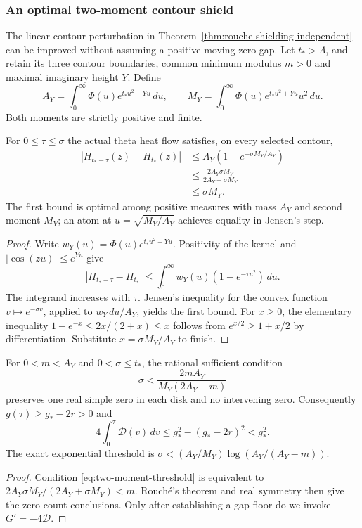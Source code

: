 \subsubsection{An optimal two-moment contour shield}
\label{subsec:two-moment-shield}
The linear contour perturbation in
Theorem~\ref{thm:rouche-shielding-independent}
can be improved without assuming a positive
moving zero gap. Let $t_*>\Lambda$, and
retain its three contour boundaries, common
minimum modulus $m>0$ and maximal imaginary
height $Y$. Define
\[
A_Y=\int_0^\infty\Phi(u)e^{t_*u^2+Yu}\,du,\qquad
M_Y=\int_0^\infty\Phi(u)e^{t_*u^2+Yu}u^2\,du.
\]
Both moments are strictly positive and finite.

\begin{theorem}
\label{thm:two-moment-shield}
For $0\le\tau\le\sigma$ the actual theta
heat flow satisfies, on every selected contour,
\begin{equation}\label{eq:two-moment-shield}
\begin{aligned}
|H_{t_*-\tau}(z)-H_{t_*}(z)|
&\le A_Y(1-e^{-\sigma M_Y/A_Y})\\
&\le\frac{2A_Y\sigma M_Y}{2A_Y+\sigma M_Y}\\
&\le\sigma M_Y.
\end{aligned}
\end{equation}
The first bound is optimal among positive
measures with mass $A_Y$ and second moment
$M_Y$; an atom at $u=\sqrt{M_Y/A_Y}$
achieves equality in Jensen's step.
\end{theorem}
\begin{proof}
Write $w_Y(u)=\Phi(u)e^{t_*u^2+Yu}$.
Positivity of the kernel and
$|\cos(zu)|\le e^{Yu}$ give
\[
|H_{t_*-\tau}-H_{t_*}|
\le\int_0^\infty w_Y(u)(1-e^{-\tau u^2})\,du.
\]
The integrand increases with $\tau$.
Jensen's inequality for the convex function
$v\mapsto e^{-\sigma v}$, applied to
$w_Y\,du/A_Y$, yields the first bound.
For $x\ge0$, the elementary inequality
$1-e^{-x}\le2x/(2+x)\le x$
follows from $e^{x/2}\ge1+x/2$
by differentiation. Substitute
$x=\sigma M_Y/A_Y$ to finish.
\end{proof}

\begin{corollary}
\label{cor:two-moment-window}
For $0<m<A_Y$ and $0<\sigma\le t_*$,
the rational sufficient condition
\begin{equation}\label{eq:two-moment-threshold}
\sigma<\frac{2mA_Y}{M_Y(2A_Y-m)}
\end{equation}
preserves one real simple zero in each
disk and no intervening zero. Consequently
$g(\tau)\ge g_*-2r>0$ and
\[
4\int_0^\tau\mathcal D(v)\,dv
\le g_*^2-(g_*-2r)^2<g_*^2.
\]
The exact exponential threshold is
$\sigma<(A_Y/M_Y)\log(A_Y/(A_Y-m))$.
\end{corollary}
\begin{proof}
Condition \eqref{eq:two-moment-threshold}
is equivalent to
$2A_Y\sigma M_Y/(2A_Y+\sigma M_Y)<m$.
Rouch\'e's theorem and real symmetry
then give the zero-count conclusions.
Only after establishing a gap floor do
we invoke $G'=-4\mathcal D$.
\end{proof}

